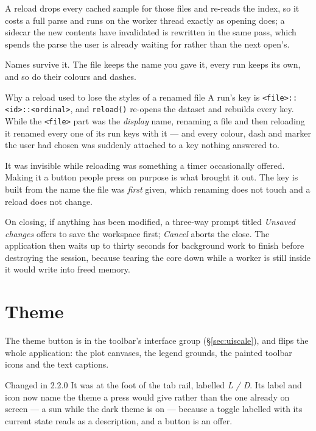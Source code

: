 \documentclass[11pt,a4paper,oneside]{report}
\newcommand{\appver}{2.2.0}
\newcommand{\code}[1]{\texttt{#1}}
\begin{document}
A reload drops every cached sample for those files and re-reads the index, so
it costs a full parse and runs on the worker thread exactly as opening does; a
sidecar the new contents have invalidated is rewritten in the same pass, which
spends the parse the user is already waiting for rather than the next open's.

Names survive it. The file keeps the name you gave it, every run keeps its own,
and so do their colours and dashes.

\begin{aoenote}{Why a reload used to lose the styles of a renamed file}
A run's key is \code{<file>::<id>::<ordinal>}, and \code{reload()} re-opens the
dataset and rebuilds every key. While the \code{<file>} part was the
\emph{display} name, renaming a file and then reloading it renamed every one of
its run keys with it --- and every colour, dash and marker the user had chosen
was suddenly attached to a key nothing answered to.

It was invisible while reloading was something a timer occasionally offered.
Making it a button people press on purpose is what brought it out. The key is
built from the name the file was \emph{first} given, which renaming does not
touch and a reload does not change.
\end{aoenote}

On closing, if anything has been modified, a three-way prompt titled
\emph{Unsaved changes} offers to save the workspace first; \emph{Cancel} aborts
the close. The application then waits up to thirty seconds for background work
to finish before destroying the session, because tearing the core down while a
worker is still inside it would write into freed memory.

\section{Theme}
\label{sec:theme}

The theme button is in the toolbar's interface group (\S\ref{sec:uiscale}),
and flips the whole application: the plot canvases, the legend grounds, the
painted toolbar icons and the text captions.

\begin{aoenew}{Changed in \appver}
It was at the foot of the tab rail, labelled \emph{L / D}. Its label and icon
now name the theme a press would give rather than the one already on screen ---
a sun while the dark theme is on --- because a toggle labelled with its current
state reads as a description, and a button is an offer.
\end{aoenew}
\end{document}
